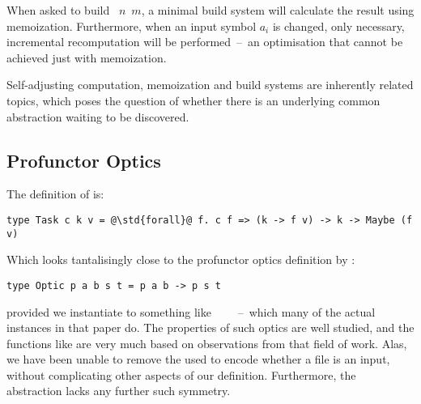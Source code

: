 \noindent
When asked to build ~$n$~$m$, a minimal build system will calculate the
result using memoization. Furthermore, when an input symbol $a_i$ is changed,
only necessary, incremental recomputation will be performed~--~an optimisation
that cannot be achieved just with memoization.

Self-adjusting computation, memoization and build systems are inherently related
topics, which poses the question of whether there is an underlying common
abstraction waiting to be discovered.

\subsection{Profunctor Optics}\label{sec-related-optics}

The definition of  is:

\begin{verbatim}
type Task c k v = @\std{forall}@ f. c f => (k -> f v) -> k -> Maybe (f v)
\end{verbatim}

\noindent
Which looks tantalisingly close to the profunctor optics definition by
\cite{pickering2017profunctor}:

\begin{verbatim}
type Optic p a b s t = p a b -> p s t
\end{verbatim}
\noindent
provided we instantiate  to something like
~\hs{->}~~~--~which many of the actual instances in that paper
do. The properties of such optics are well studied, and the functions like
 are very much based on observations from that field of work.
Alas, we have been unable to remove the  used to encode whether a file
is an input, without complicating other aspects of our definition. Furthermore,
the  abstraction lacks any further such symmetry.
